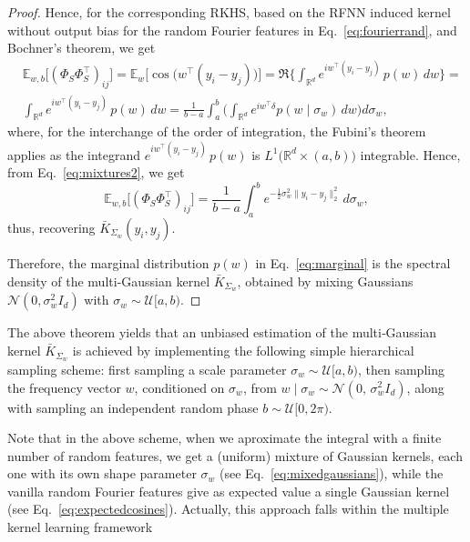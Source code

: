 \documentclass{article}
\begin{document}
\begin{proof}
Hence, for the corresponding RKHS, based on the RFNN induced kernel without output bias for the random Fourier features in Eq.~\eqref{eq:fourierrand}, and Bochner's theorem, we get
\begin{align} 
& \mathbb{E}_{w,b}\big[(\Phi_S\Phi_S^\top)_{ij}\big]
= \mathbb{E}_{w}\big[\cos \big(w^\top (y_i - y_j)\big)\big] = \Re\Big\{\int_{\mathbb{R}^d} e^{i w^{\top} (y_i - y_j)}\, p(w)\, dw \Big\}= \nonumber \\ 
& \int_{\mathbb{R}^d} e^{i w^\top (y_i - y_j)}\,p(w)\,dw
=\frac{1}{b-a}\int_a^b \Big(\int_{\mathbb{R}^d} e^{i w^\top \delta} p(w\mid \sigma_w)\,dw\Big) d\sigma_w,
\label{eq:mixtures2}
\end{align}
where, for the interchange of the order of integration, the Fubini's theorem \cite{rudin1987real} applies as the integrand $e^{i w^\top(y_i - y_j)}\,p(w)$ is $L^1 \big(\mathbb{R}^d\times(a,b)\big)$ integrable. Hence, from Eq.~\eqref{eq:mixtures2}, we get
\begin{equation}
\mathbb{E}_{w,b}\big[(\Phi_S\Phi_S^\top)_{ij}\big]=\frac{1}{b-a}\int_a^b e^{-\frac{1}{2}\sigma_w^2 \|y_i - y_j\|_2^2}\,d\sigma_w,
\end{equation}
thus, recovering $\bar{K}_{\Sigma_w}(y_i, y_j)$.

Therefore, the marginal distribution $p(w)$ in Eq.~\eqref{eq:marginal} is the spectral density of the multi-Gaussian kernel $\bar{K}_{\Sigma_w}$, obtained by mixing Gaussians $\mathcal{N}\left(0, \sigma_w^2I_d\right)$ with $\sigma_w \sim \mathcal{U}[a,b)$.
\end{proof}
The above theorem yields that an unbiased estimation of the multi‑Gaussian kernel $\bar{K}_{\Sigma_w}$ is achieved by implementing the following simple hierarchical sampling scheme:  first sampling a scale parameter $\sigma_w \sim \mathcal{U}[a,b)$, then sampling the frequency vector $w$, conditioned on $\sigma_w$, from $w \mid \sigma_w \sim \mathcal{N}(0,\,\sigma_w^2 I_d)$, along with sampling an independent random phase $b \sim \mathcal{U}[0,2\pi)$.

Note that in the above scheme, when we aproximate the integral with a finite number of random features, we get a (uniform) mixture of Gaussian kernels, each one with its own shape parameter $\sigma_w$ (see Eq.~\eqref{eq:mixedgaussians}), while the vanilla random Fourier features give as expected value a single Gaussian kernel (see Eq.~\eqref{eq:expectedcosines}). Actually, this approach falls within the multiple kernel learning framework \cite{bach2008exploring,lin2008dimensionality,gonen2011multiple}%
\end{document}
